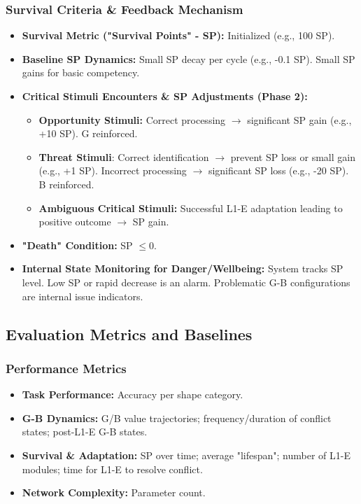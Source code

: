 \documentclass{article}
\begin{document}
\subsubsection{Survival Criteria \& Feedback Mechanism}
\begin{itemize}
    \item \textbf{Survival Metric ("Survival Points" - SP):} Initialized (e.g., 100 SP).
    \item \textbf{Baseline SP Dynamics:} Small SP decay per cycle (e.g., -0.1 SP). Small SP gains for basic competency.
    \item \textbf{Critical Stimuli Encounters \& SP Adjustments (Phase 2):}
    \begin{itemize}
        \item \textbf{Opportunity Stimuli:} Correct processing $\rightarrow$ significant SP gain (e.g., +10 SP). G reinforced.
        \item \textbf{Threat Stimuli}: Correct identification $\rightarrow$ prevent SP loss or small gain (e.g., +1 SP). Incorrect processing $\rightarrow$ significant SP loss (e.g., -20 SP). B reinforced.
        \item \textbf{Ambiguous Critical Stimuli:} Successful L1-E adaptation leading to positive outcome $\rightarrow$ SP gain.
    \end{itemize}
    \item \textbf{"Death" Condition:} SP $\le 0$.
    \item \textbf{Internal State Monitoring for Danger/Wellbeing:} System tracks SP level. Low SP or rapid decrease is an alarm. Problematic G-B configurations are internal issue indicators.
\end{itemize}

\subsection{Evaluation Metrics and Baselines}

\subsubsection{Performance Metrics}
\begin{itemize}
    \item \textbf{Task Performance:} Accuracy per shape category.
    \item \textbf{G-B Dynamics:} G/B value trajectories; frequency/duration of conflict states; post-L1-E G-B states.
    \item \textbf{Survival \& Adaptation:} SP over time; average "lifespan"; number of L1-E modules; time for L1-E to resolve conflict.
    \item \textbf{Network Complexity:} Parameter count.
\end{itemize}
\end{document}
